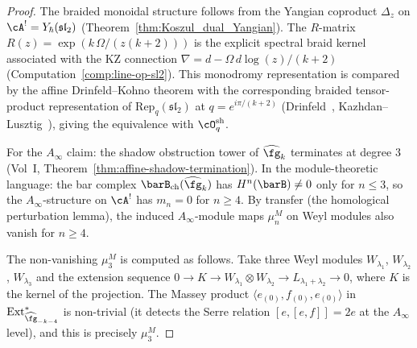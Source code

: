 \begin{proof}
The braided monoidal structure follows from the Yangian
coproduct $\Delta_z$ on $\cA^!=Y_\hbar(\mathfrak{sl}_2)$
(Theorem~\ref{thm:Koszul_dual_Yangian}). The
$R$-matrix $R(z)=\exp(k\,\Omega/(z(k{+}2)))$ is the
explicit spectral braid kernel associated with the KZ connection
$\nabla=d-\Omega\,d\log(z)/(k+2)$
(Computation~\ref{comp:line-op-sl2}). This monodromy
representation is compared by the affine Drinfeld--Kohno theorem
with the corresponding braided tensor-product representation of
$\mathrm{Rep}_q(\mathfrak{sl}_2)$ at $q=e^{i\pi/(k+2)}$
(Drinfeld~\cite{Dri89}, Kazhdan--Lusztig~\cite{KL93}),
giving the equivalence with $\cO^{\mathrm{sh}}_q$.

For the $A_\infty$ claim: the shadow obstruction tower
of $\widehat{\fg}_k$ terminates at degree $3$
(Vol~I, Theorem~\ref*{thm:affine-shadow-termination}).
In the module-theoretic language: the bar complex
$\barB_{\mathrm{ch}}(\widehat{\fg}_k)$ has
$H^n(\barB)\ne 0$ only for $n\le 3$, so the
$A_\infty$-structure on $\cA^!$ has $m_n=0$ for $n\ge 4$.
By transfer (the homological perturbation lemma), the
induced $A_\infty$-module maps $\mu_n^M$ on Weyl modules
also vanish for $n\ge 4$.

The non-vanishing $\mu_3^M$ is computed as follows.
Take three Weyl modules $W_{\lambda_1}$, $W_{\lambda_2}$,
$W_{\lambda_3}$ and the extension sequence
$0\to K\to W_{\lambda_1}\otimes W_{\lambda_2}
\to L_{\lambda_1+\lambda_2}\to 0$,
where $K$ is the kernel of the projection. The Massey
product $\langle e_{(0)},f_{(0)},e_{(0)}\rangle$ in
$\operatorname{Ext}^*_{\widehat{\fg}_{-k-4}}$ is
non-trivial (it detects the Serre relation
$[e,[e,f]]=2e$ at the $A_\infty$ level), and this is
precisely $\mu_3^M$.
\end{proof}

